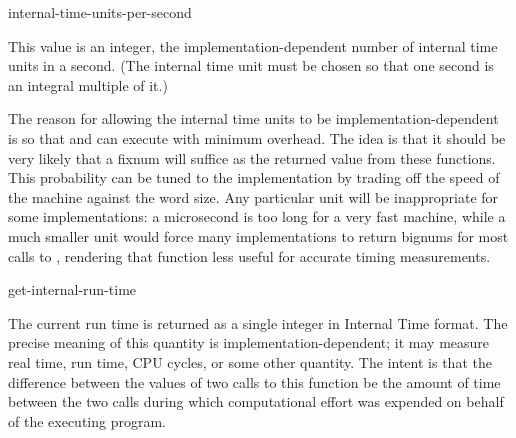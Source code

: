 \begin{defun}[Constant]
internal-time-units-per-second

This value is an integer, the implementation-dependent
number of internal time units in a second.  (The internal time unit must
be chosen so that one second is an integral multiple of it.)


\beforenoterule
\begin{rationale}
The reason for allowing the internal time
units to be implementation-dependent is so that
 and 
can execute with minimum overhead.
The idea is that it should be very likely that a fixnum will suffice as the
returned value from these functions.  This probability can be
tuned to the implementation by trading off the speed of the machine
against the word size.  Any particular unit will
be inappropriate for some implementations: a microsecond is too long
for a very fast machine, while a much smaller unit would
force many implementations to return bignums for most calls
to , rendering that function less useful for accurate
timing measurements.
\end{rationale}
\afternoterule
\end{defun}

\begin{defun}[Function]
get-internal-run-time 

The current run time is returned as a single integer in Internal Time
format.
The precise meaning of this quantity is implementation-dependent;
it may measure real time, run time, CPU cycles, or some other quantity.
The intent is that the difference between the values of two calls
to this function be the amount of time between the two calls
during which computational effort was expended on behalf of the
executing program.

\end{defun}

